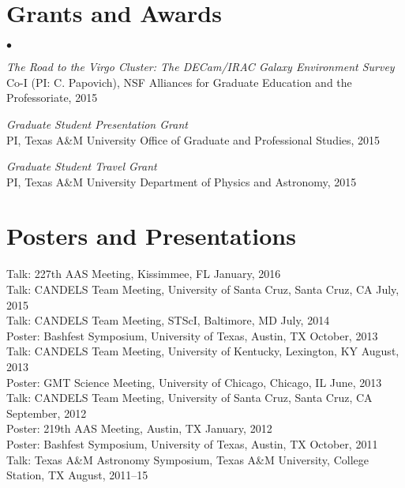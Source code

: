 \documentclass[margin,line, 11pt]{Boada_res}
\newenvironment{list2}{
  \begin{list}{$\bullet$}{%
      \setlength{\itemsep}{0in}
      \setlength{\parsep}{0in} \setlength{\parskip}{0in}
      \setlength{\topsep}{0in} \setlength{\partopsep}{0in} 
      \setlength{\leftmargin}{0.2in}}}{\end{list}}
\begin{document}
\begin{resume}
\section{\sc Grants and Awards}
\begin{list2}
    \item \emph{The Road to the Virgo Cluster: The DECam/IRAC Galaxy Environment Survey}\\
	Co-I (PI: C. Papovich), NSF Alliances for Graduate Education and the Professoriate, 2015
	\item \emph{Graduate Student Presentation Grant}\\
	PI, Texas A\&M University Office of Graduate and Professional Studies, 2015
	\item \emph{Graduate Student Travel Grant}\\
	PI, Texas A\&M University Department of Physics and Astronomy, 2015
\end{list2}

\section{\sc Posters and Presentations}
Talk: 227th AAS Meeting, Kissimmee, FL January, 2016\\
Talk: CANDELS Team Meeting, University of Santa Cruz, Santa Cruz, CA July, 2015\\
Talk: CANDELS Team Meeting, STScI, Baltimore, MD July, 2014\\
Poster: Bashfest Symposium, University of Texas, Austin, TX October, 2013\\
Talk: CANDELS Team Meeting, University of Kentucky, Lexington, KY August, 2013\\
Poster: GMT Science Meeting, University of Chicago, Chicago, IL June, 2013\\
Talk: CANDELS Team Meeting, University of Santa Cruz, Santa Cruz, CA September, 2012\\
Poster: 219th AAS Meeting, Austin, TX January, 2012\\ 
Poster: Bashfest Symposium, University of Texas, Austin, TX October, 2011\\
Talk: Texas A\&M Astronomy Symposium, Texas A\&M University, College Station, TX August, 2011--15\\


\end{resume}
\end{document}
